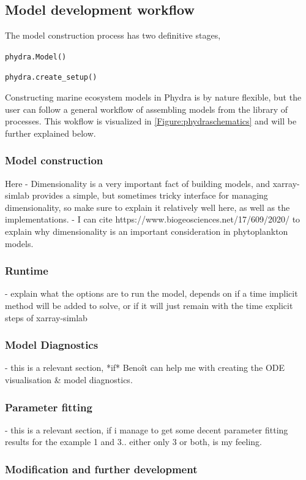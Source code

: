 \documentclass[template.tex]{subfiles}
\begin{document}
\subsection{Model development workflow}

The model construction process has two definitive stages, 
 
 \texttt{phydra.Model()}
 
 \texttt{phydra.create_setup()}

Constructing marine ecosystem models in Phydra is by nature flexible, but the user can follow a general workflow of assembling models from the library of processes. This wokflow is visualized in \ref{Figure:phydraschematics} and will be further explained below.

\subsubsection{Model construction}
Here 
- Dimensionality is a very important fact of building models, and xarray-simlab provides a simple, but sometimes tricky interface for managing dimensionality, so make sure to explain it relatively well here, as well as the implementations.
- I can cite https://www.biogeosciences.net/17/609/2020/ to explain why dimensionality is an important consideration in phytoplankton models.

\subsubsection{Runtime}
- explain what the options are to run the model, depends on if a time implicit method will be added to solve, or if it will just remain with the time explicit steps of xarray-simlab

\subsubsection{Model Diagnostics}
- this is a relevant section, *if* Benoît can help me with creating the ODE visualisation & model diagnostics.

\subsubsection{Parameter fitting}
- this is a relevant section, if i manage to get some decent parameter fitting results for the example 1 and 3.. either only 3 or both, is my feeling. 


\subsubsection{Modification and further development}
\end{document}
